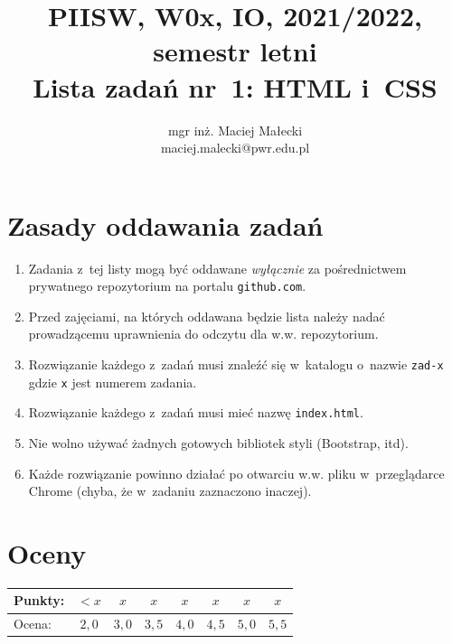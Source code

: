 \documentclass[12pt]{article}
\title{PIISW, W0x, IO, 2021/2022, semestr letni\\Lista zadań nr~1: HTML i~CSS}
\author{mgr inż. Maciej Małecki\\ \small maciej.malecki@pwr.edu.pl}
\begin{document}
    \maketitle

    \section*{Zasady oddawania zadań}
        \begin{enumerate}
            \item Zadania z~tej listy mogą być oddawane \emph{wyłącznie} za pośrednictwem prywatnego repozytorium na portalu \texttt{github.com}.
            \item Przed zajęciami, na których oddawana będzie lista należy nadać prowadzącemu uprawnienia do odczytu dla w.w. repozytorium.
            \item Rozwiązanie każdego z~zadań musi znaleźć się w~katalogu o~nazwie \texttt{zad-x} gdzie \texttt{x} jest numerem zadania.
            \item Rozwiązanie każdego z~zadań musi mieć nazwę \texttt{index.html}.
            \item Nie wolno używać żadnych gotowych bibliotek styli (Bootstrap, itd).
            \item Każde rozwiązanie powinno działać po otwarciu w.w. pliku w~przeglądarce Chrome (chyba, że w~zadaniu zaznaczono inaczej).
        \end{enumerate}

    \section*{Oceny}
    \begin{tabular}{|l|c|c|c|c|c|c|c|}
        \hline
        Punkty: & $<x$ & $x$ & $x$ & $x$ & $x$ & $x$ & $x$\\
        \hline
        Ocena:  & $2,0$ & $3,0$ & $3,5$ & $4,0$ & $4,5$ & $5,0$ & $5,5$\\
        \hline
    \end{tabular}
\end{document}
